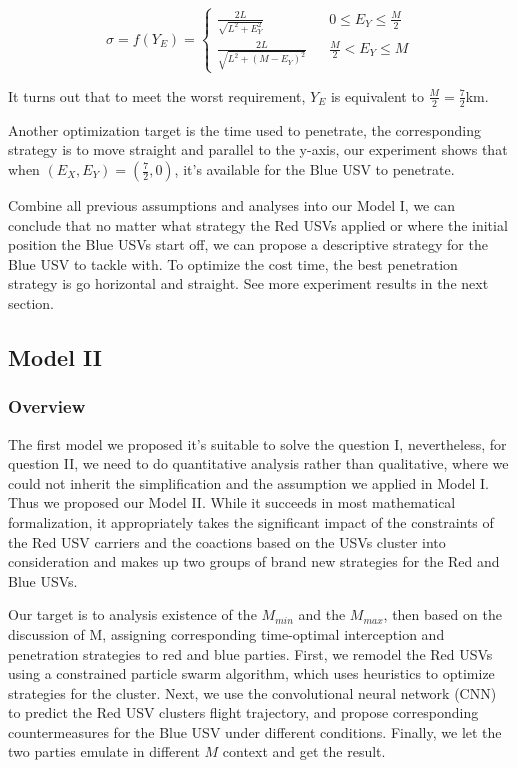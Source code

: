 \documentclass{mcmthesis}
\begin{document}
\begin{equation}
\sigma=f(Y_E)=\left\{
\begin{array}{rcl}
\frac{2L}{\sqrt{L^2+E_Y^2}} & & {0 \leq E_Y \leq \frac{M}{2}}\\
\frac{2L}{\sqrt{L^2+(M-E_Y)^2}} & & {\frac{M}{2} < E_Y \leq M }
\end{array} \right.
\end{equation}

It turns out that to meet the worst requirement, $Y_E$ is equivalent to $\frac{M}{2}=\frac{7}{2}$km.

Another optimization target is the time used to penetrate, the corresponding strategy is to move straight and parallel to the y-axis, our experiment shows that when $(E_X, E_Y) = (\frac{7}{2}, 0)$, it's available for the Blue USV to penetrate.

Combine all previous assumptions and analyses into our Model I, we can conclude that no matter what strategy the Red USVs applied or where the initial position the Blue USVs start off, we can propose a descriptive strategy for the Blue USV to tackle with. To optimize the cost time, the best penetration strategy is go horizontal and straight. See more experiment results in the next section.

\subsection{Model II}
\subsubsection{Overview}
The first model we proposed it's suitable to solve the question I, nevertheless, for question II, we need to do quantitative analysis rather than qualitative, where we could not inherit the simplification and the assumption we applied in Model I. Thus we proposed our Model II. While it succeeds in most mathematical formalization, it appropriately takes the significant impact of the constraints of the Red USV carriers and the coactions based on the USVs cluster into consideration and makes up two groups of brand new strategies for the Red and Blue USVs. \par

Our target is to analysis existence of the $M_{min}$ and the $M_{max}$, then based on the discussion of M, assigning corresponding time-optimal interception and penetration strategies to red and blue parties. First, we remodel the Red USVs using a constrained particle swarm algorithm, which uses heuristics to optimize strategies for the cluster. Next, we use the convolutional neural network (CNN) to predict the Red USV clusters flight trajectory, and propose corresponding countermeasures for the Blue USV under different conditions. Finally, we let the two parties emulate in different $M$ context and get the result.
\end{document}
